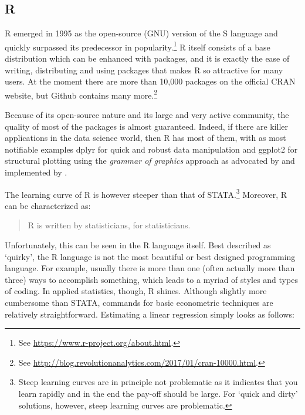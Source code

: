\documentclass[fleqn,10pt]{SelfArx} %
\begin{document}
\subsection*{R}

R emerged in 1995 as the open-source (GNU) version of the S language and quickly surpassed its predecessor in popularity.\footnote{See \href{https://www.r-project.org/about.html}{https://www.r-project.org/about.html}.} R itself consists of a base distribution which can be enhanced with packages, and it is exactly the ease of writing, distributing and using packages that makes R so attractive for many users. At the moment there are more than 10,000 packages on the official CRAN website, but Github contains many more.\footnote{See \href{http://blog.revolutionanalytics.com/2017/01/cran-10000.html}{http://blog.revolutionanalytics.com/2017/01/cran-10000.html}.}

Because of its open-source nature and its large and very active community, the quality of most of the packages is almost guaranteed. Indeed, if there are killer applications in the data science world, then R has most of them, with as most notifiable examples dplyr for quick and robust data manipulation and ggplot2 for structural plotting using the \textit{grammar of graphics} approach as advocated by \citet{wilkinson2006grammar} and implemented by \citet{wickham2013implementation}. 

The learning curve of R is however steeper than that of STATA.\footnote{Steep learning curves are in principle not problematic as it indicates that you learn rapidly and in the end the pay-off should be large. For `quick and dirty' solutions, however, steep learning curves are problematic.} Moreover, R can be characterized as:
\begin{quote}
	R is written by statisticians, for statisticians.
\end{quote}
Unfortunately, this can be seen in the R language itself. Best described as `quirky', the R language is not the most beautiful or best designed programming language. For example, usually there is more than one (often actually more than three) ways to accomplish something, which leads to a myriad of styles and types of coding. In applied statistics, though, R shines. Although slightly more cumbersome than STATA, commands for basic econometric techniques are relatively straightforward. Estimating a linear regression simply looks as follows:
\end{document}
